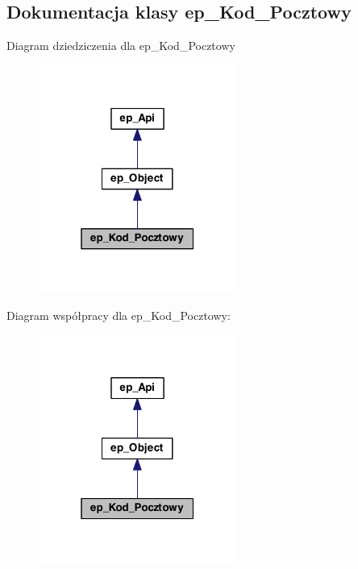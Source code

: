 \hypertarget{classep___kod___pocztowy}{\subsection{Dokumentacja klasy ep\-\_\-\-Kod\-\_\-\-Pocztowy}
\label{classep___kod___pocztowy}
}


Diagram dziedziczenia dla ep\-\_\-\-Kod\-\_\-\-Pocztowy\nopagebreak
\begin{figure}[H]
\begin{center}
\leavevmode
\includegraphics[width=184pt]{classep___kod___pocztowy__inherit__graph}
\end{center}
\end{figure}


Diagram współpracy dla ep\-\_\-\-Kod\-\_\-\-Pocztowy\-:\nopagebreak
\begin{figure}[H]
\begin{center}
\leavevmode
\includegraphics[width=184pt]{classep___kod___pocztowy__coll__graph}
\end{center}
\end{figure}
